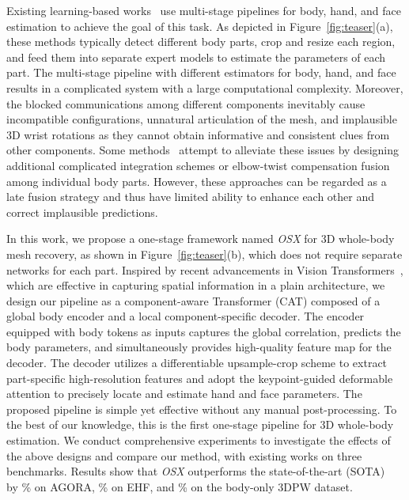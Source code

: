 \documentclass[10pt,twocolumn,letterpaper]{article}
\newcommand{\modelname}{\emph{OSX}\xspace}
\begin{document}
Existing learning-based works~\cite{PavlakosGeorgios2020expose,Feng_2021_pixie,Rong_2021frank,GyeongsikMoon2020hand4whole,HongwenZhang2022PyMAFXTW} use multi-stage pipelines for body, hand, and face estimation to achieve the goal of this task. 
As depicted in Figure~\ref{fig:teaser}(a), these methods typically detect different body parts, crop and resize each region, and feed them into separate expert models to estimate the parameters of each part. 
The multi-stage pipeline with different estimators for body, hand, and face results in a complicated system with a large computational complexity. Moreover, the blocked communications among different components inevitably cause incompatible configurations, unnatural articulation of the mesh, and implausible 3D wrist rotations as they cannot obtain informative and consistent clues from other components. 
Some methods~\cite{Feng_2021_pixie,GyeongsikMoon2020hand4whole,HongwenZhang2022PyMAFXTW} attempt to alleviate these issues by designing additional complicated integration schemes or elbow-twist compensation fusion among individual body parts. However, these approaches can be regarded as a late fusion strategy and thus have limited ability to enhance each other and correct implausible predictions. 

In this work, we propose a one-stage framework named \modelname for 3D whole-body mesh recovery, as shown in Figure~\ref{fig:teaser}(b), which does not require separate networks for each part.
Inspired by recent advancements in Vision Transformers~\cite{dosovitskiy2020vit,YufeiXu2022ViTPoseSV}, which are effective in capturing spatial information in a plain architecture, we design our pipeline as a component-aware Transformer (CAT) composed of a global body encoder and a local component-specific decoder. The encoder equipped with body tokens as inputs captures the global correlation, predicts the body parameters, and simultaneously provides high-quality feature map for the decoder.
The decoder utilizes a differentiable upsample-crop scheme to extract part-specific high-resolution features and adopt the keypoint-guided deformable attention to precisely locate and estimate hand and face parameters. 
 The proposed pipeline is simple yet effective without any manual post-processing. To the best of our knowledge, this is the first one-stage pipeline for 3D whole-body estimation. 
We conduct comprehensive experiments to investigate the effects of the above designs and compare our method, with existing works on three benchmarks. Results show that \modelname outperforms the state-of-the-art (SOTA)~\cite{GyeongsikMoon2020hand4whole} by \% on AGORA, \% on EHF, and \% on the body-only 3DPW dataset.
\end{document}
